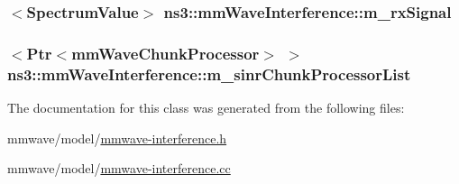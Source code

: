 \subsubsection[{\texorpdfstring{m\+\_\+rx\+Signal}{m_rxSignal}}]{$<${\bf Spectrum\+Value}$>$ ns3\+::mm\+Wave\+Interference\+::m\+\_\+rx\+Signal\hspace{0.3cm}{\ttfamily [private]}}\hypertarget{classns3_1_1mmWaveInterference_a3de17b3ae1f17d561ffdcc03f4422845}{}\label{classns3_1_1mmWaveInterference_a3de17b3ae1f17d561ffdcc03f4422845}
\subsubsection[{\texorpdfstring{m\+\_\+sinr\+Chunk\+Processor\+List}{m_sinrChunkProcessorList}}]{$<${\bf Ptr}$<${\bf mm\+Wave\+Chunk\+Processor}$>$ $>$ ns3\+::mm\+Wave\+Interference\+::m\+\_\+sinr\+Chunk\+Processor\+List\hspace{0.3cm}{\ttfamily [private]}}\hypertarget{classns3_1_1mmWaveInterference_a8d6356e71fd3eaa06ff52a5d07462db4}{}\label{classns3_1_1mmWaveInterference_a8d6356e71fd3eaa06ff52a5d07462db4}


The documentation for this class was generated from the following files\+:\begin{DoxyCompactItemize}
\item 
mmwave/model/\hyperlink{mmwave-interference_8h}{mmwave-\/interference.\+h}\item 
mmwave/model/\hyperlink{mmwave-interference_8cc}{mmwave-\/interference.\+cc}\end{DoxyCompactItemize}
